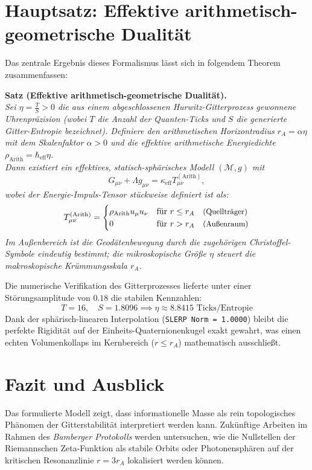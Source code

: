 \documentclass[11pt,a4paper,nofootinbib]{article}
\begin{document}
\section{Hauptsatz: Effektive arithmetisch-geometrische Dualität}
Das zentrale Ergebnis dieses Formalismus lässt sich in folgendem Theorem zusammenfassen:

\medskip
\noindent\textbf{Satz (Effektive arithmetisch-geometrische Dualität).}\\
\textit{Sei $\eta = \frac{T}{S} > 0$ die aus einem abgeschlossenen Hurwitz-Gitterprozess gewonnene Uhrenpräzision (wobei $T$ die Anzahl der Quanten-Ticks und $S$ die generierte Gitter-Entropie bezeichnet). Definiere den arithmetischen Horizontradius $r_A = \alpha \eta$ mit dem Skalenfaktor $\alpha > 0$ und die effektive arithmetische Energiedichte $\rho_{\text{Arith}} = \hbar_{\text{eff}} \eta$.\\
Dann existiert ein effektives, statisch-sphärisches Modell $(\mathcal{M}, g)$ mit
\begin{equation}
    G_{\mu\nu} + \Lambda g_{\mu\nu} = \kappa_{\text{eff}} T_{\mu\nu}^{(\text{Arith})},
\end{equation}
wobei der Energie-Impuls-Tensor stückweise definiert ist als:
\begin{equation}
    T_{\mu\nu}^{(\text{Arith})} = \begin{cases} 
    \rho_{\text{Arith}} u_\mu u_\nu & \text{für } r \le r_A \quad \text{\small(Quellträger)} \\ 
    0 & \text{für } r > r_A \quad \text{\small(Außenraum)} 
    \end{cases}
\end{equation}
Im Außenbereich ist die Geodätenbewegung durch die zugehörigen Christoffel-Symbole eindeutig bestimmt; die mikroskopische Größe $\eta$ steuert die makroskopische Krümmungsskala $r_A$.}\\
\medskip

Die numerische Verifikation des Gitterprozesses lieferte unter einer Störungsamplitude von $0.18$ die stabilen Kennzahlen:
\begin{equation}
    T = 16, \quad S = 1.8096 \implies \eta \approx 8.8415 \text{ Ticks/Entropie}
\end{equation}
Dank der sphärisch-linearen Interpolation (\texttt{SLERP Norm = 1.0000}) bleibt die perfekte Rigidität auf der Einheits-Quaternionenkugel exakt gewahrt, was einen echten Volumenkollaps im Kernbereich ($r \le r_A$) mathematisch ausschließt.

\section{Fazit und Ausblick}
Das formulierte Modell zeigt, dass informationelle Masse als rein topologisches Phänomen der Gitterstabilität interpretiert werden kann. Zukünftige Arbeiten im Rahmen des \textit{Bamberger Protokolls} werden untersuchen, wie die Nullstellen der Riemannschen Zeta-Funktion als stabile Orbits oder Photonensphären auf der kritischen Resonanzlinie $r = 3 r_A$ lokalisiert werden können.
\end{document}
